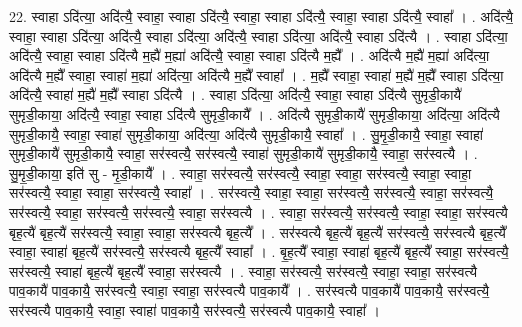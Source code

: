 \documentclass[17pt]{extarticle}
\begin{document}
22. स्वाहा ऽदि॑त्या॒ अदि॑त्यै॒ स्वाहा॒ स्वाहा ऽदि॑त्यै॒ स्वाहा॒ स्वाहा ऽदि॑त्यै॒ स्वाहा॒ स्वाहा ऽदि॑त्यै॒ स्वाहा᳚ । . अदि॑त्यै॒ स्वाहा॒ स्वाहा ऽदि॑त्या॒ अदि॑त्यै॒ स्वाहा ऽदि॑त्या॒ अदि॑त्यै॒ स्वाहा ऽदि॑त्या॒ अदि॑त्यै॒ स्वाहा ऽदि॑त्यै । . स्वाहा ऽदि॑त्या॒ अदि॑त्यै॒ स्वाहा॒ स्वाहा ऽदि॑त्यै म॒ह्यै॑ म॒ह्या॑ अदि॑त्यै॒ स्वाहा॒ स्वाहा ऽदि॑त्यै म॒ह्यै᳚ । . अदि॑त्यै म॒ह्यै॑ म॒ह्या॑ अदि॑त्या॒ अदि॑त्यै म॒ह्यै᳚ स्वाहा॒ स्वाहा॑ म॒ह्या॑ अदि॑त्या॒ अदि॑त्यै म॒ह्यै᳚ स्वाहा᳚ । . म॒ह्यै᳚ स्वाहा॒ स्वाहा॑ म॒ह्यै॑ म॒ह्यै᳚ स्वाहा ऽदि॑त्या॒ अदि॑त्यै॒ स्वाहा॑ म॒ह्यै॑ म॒ह्यै᳚ स्वाहा ऽदि॑त्यै । . स्वाहा ऽदि॑त्या॒ अदि॑त्यै॒ स्वाहा॒ स्वाहा ऽदि॑त्यै सुमृडी॒कायै॑ सुमृडी॒काया॒ अदि॑त्यै॒ स्वाहा॒ स्वाहा ऽदि॑त्यै सुमृडी॒कायै᳚ । . अदि॑त्यै सुमृडी॒कायै॑ सुमृडी॒काया॒ अदि॑त्या॒ अदि॑त्यै सुमृडी॒कायै॒ स्वाहा॒ स्वाहा॑ सुमृडी॒काया॒ अदि॑त्या॒ अदि॑त्यै सुमृडी॒कायै॒ स्वाहा᳚ । . सु॒मृ॒डी॒कायै॒ स्वाहा॒ स्वाहा॑ सुमृडी॒कायै॑ सुमृडी॒कायै॒ स्वाहा॒ सर॑स्वत्यै॒ सर॑स्वत्यै॒ स्वाहा॑ सुमृडी॒कायै॑ सुमृडी॒कायै॒ स्वाहा॒ सर॑स्वत्यै । . सु॒मृ॒डी॒काया॒ इति॑ सु - मृ॒डी॒कायै᳚ । . स्वाहा॒ सर॑स्वत्यै॒ सर॑स्वत्यै॒ स्वाहा॒ स्वाहा॒ सर॑स्वत्यै॒ स्वाहा॒ स्वाहा॒ सर॑स्वत्यै॒ स्वाहा॒ स्वाहा॒ सर॑स्वत्यै॒ स्वाहा᳚ । . सर॑स्वत्यै॒ स्वाहा॒ स्वाहा॒ सर॑स्वत्यै॒ सर॑स्वत्यै॒ स्वाहा॒ सर॑स्वत्यै॒ सर॑स्वत्यै॒ स्वाहा॒ सर॑स्वत्यै॒ सर॑स्वत्यै॒ स्वाहा॒ सर॑स्वत्यै । . स्वाहा॒ सर॑स्वत्यै॒ सर॑स्वत्यै॒ स्वाहा॒ स्वाहा॒ सर॑स्वत्यै बृह॒त्यै॑ बृह॒त्यै॑ सर॑स्वत्यै॒ स्वाहा॒ स्वाहा॒ सर॑स्वत्यै बृह॒त्यै᳚ । . सर॑स्वत्यै बृह॒त्यै॑ बृह॒त्यै॑ सर॑स्वत्यै॒ सर॑स्वत्यै बृह॒त्यै᳚ स्वाहा॒ स्वाहा॑ बृह॒त्यै॑ सर॑स्वत्यै॒ सर॑स्वत्यै बृह॒त्यै᳚ स्वाहा᳚ । . बृ॒ह॒त्यै᳚ स्वाहा॒ स्वाहा॑ बृह॒त्यै॑ बृह॒त्यै᳚ स्वाहा॒ सर॑स्वत्यै॒ सर॑स्वत्यै॒ स्वाहा॑ बृह॒त्यै॑ बृह॒त्यै᳚ स्वाहा॒ सर॑स्वत्यै । . स्वाहा॒ सर॑स्वत्यै॒ सर॑स्वत्यै॒ स्वाहा॒ स्वाहा॒ सर॑स्वत्यै पाव॒कायै॑ पाव॒कायै॒ सर॑स्वत्यै॒ स्वाहा॒ स्वाहा॒ सर॑स्वत्यै पाव॒कायै᳚ । . सर॑स्वत्यै पाव॒कायै॑ पाव॒कायै॒ सर॑स्वत्यै॒ सर॑स्वत्यै पाव॒कायै॒ स्वाहा॒ स्वाहा॑ पाव॒कायै॒ सर॑स्वत्यै॒ सर॑स्वत्यै पाव॒कायै॒ स्वाहा᳚ । \newline
\end{document}
